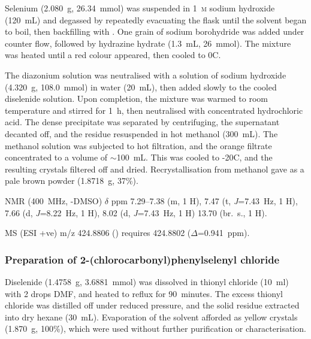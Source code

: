 \begin{refsection}
Selenium (2.080~g, 26.34~mmol) was suspended in 1~\textsc{m} sodium hydroxide (120~mL) and degassed by repeatedly evacuating the flask until the solvent began to boil, then backfilling with .
One grain of sodium borohydride was added under  counter flow, followed by hydrazine hydrate (1.3~mL, 26~mmol).
The mixture was heated until a red colour appeared, then cooled to 0\degree{}C.

The diazonium solution was neutralised with a solution of sodium hydroxide (4.320~g, 108.0~mmol) in water (20~mL), then added slowly to the cooled diselenide solution.
Upon completion, the mixture was warmed to room temperature and stirred for 1~h, then neutralised with concentrated hydrochloric acid.
The dense precipitate was separated by centrifuging, the supernatant decanted off, and the residue resuspended in hot methanol (300~mL).
The methanol solution was subjected to hot filtration, and the orange filtrate concentrated to a volume of $\sim$100~mL.
This was cooled to -20\degree{}C, and the resulting crystals filtered off and dried.
Recrystallisation from methanol gave  as a pale brown powder (1.8718~g, 37\%).

 NMR (400~MHz, -DMSO) $ \delta $ ppm
7.29--7.38 (m, 1 H),
7.47 (t, \textit{J}=7.43~Hz, 1 H),
7.66 (d, \textit{J}=8.22~Hz, 1 H),
8.02 (d, \textit{J}=7.43~Hz, 1 H)
13.70 (br.\ s., 1 H).

MS (ESI +ve) m/z 424.8806 ()  requires 424.8802 ($ \Delta $=0.941~ppm).

\subsubsection[Preparation of \refcmpd{dichloride}]{Preparation of 2-(chlorocarbonyl)phenylselenyl chloride }
Diselenide  (1.4758~g, 3.6881~mmol) was dissolved in thionyl chloride (10~ml) with 2 drops DMF, and heated to reflux for 90~minutes.
The excess thionyl chloride was distilled off under reduced pressure, and the solid residue extracted into dry hexane (30~mL).
Evaporation of the solvent afforded  as yellow crystals (1.870~g, 100\%), which were used without further purification or characterisation.


\end{refsection}
